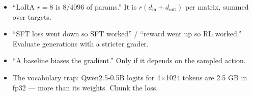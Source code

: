 \begin{trap}
\begin{itemize}
\item ``LoRA $r{=}8$ is $8/4096$ of params.'' It is $r(d_\text{in}{+}d_\text{out})$ per matrix, summed over targets.
\item ``SFT loss went down so SFT worked'' / ``reward went up so RL worked.'' Evaluate generations with a stricter grader.
\item ``A baseline biases the gradient.'' Only if it depends on the sampled action.
\item The vocabulary trap: Qwen2.5-0.5B logits for 4$\times$1024 tokens are 2.5 GB in fp32 --- more than its weights. Chunk the loss.
\end{itemize}
\end{trap}
